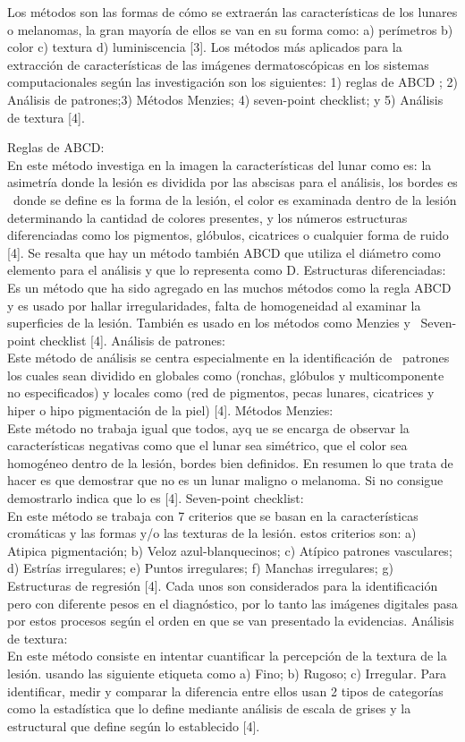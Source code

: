 \documentclass[a4paper]{article}
\begin{document}
Los métodos son las formas de cómo se extraerán las características de los lunares o melanomas, la gran mayoría de ellos se van en su forma como: a) perímetros b) color c) textura d) luminiscencia [3].
Los métodos más aplicados para la extracción de características de las imágenes dermatoscópicas en los sistemas computacionales según las investigación son los siguientes: 1) reglas de ABCD ; 2) Análisis de patrones;3) Métodos Menzies; 4) seven-point checklist; y 5) Análisis de textura [4].

Reglas de ABCD:\\ 
En este método investiga en la imagen la características del lunar como es: la asimetría donde la lesión es dividida por las abscisas para el análisis, los bordes es  donde se define es la forma de la lesión, el color es examinada dentro de la lesión determinando la cantidad de colores presentes, y los números estructuras diferenciadas como los pigmentos, glóbulos, cicatrices o cualquier forma de ruido [4].
Se resalta que hay un método también ABCD que utiliza el diámetro como elemento para el análisis y que lo representa como D. 
Estructuras diferenciadas:\\
Es un método que ha sido agregado en las muchos métodos como la regla ABCD y es usado por hallar irregularidades, falta de homogeneidad al examinar la superficies de la lesión. También es usado en los métodos como Menzies y  Seven-point checklist [4].
Análisis de patrones:\\
Este método de análisis se centra especialmente en la identificación de  patrones los cuales sean dividido en globales como (ronchas, glóbulos y multicomponente no especificados) y locales como (red de pigmentos, pecas lunares, cicatrices y hiper o hipo pigmentación de la piel) [4].
Métodos Menzies:\\
Este método no trabaja igual que todos, ayq ue se encarga de observar la características negativas como que el lunar sea simétrico, que el color sea homogéneo dentro de la lesión, bordes bien definidos. En resumen lo que trata de hacer es que demostrar que no es un lunar maligno o melanoma. Si no consigue demostrarlo indica que lo es [4].
Seven-point checklist:\\
En este método se trabaja con 7 criterios que se basan en la características cromáticas y las formas y/o las texturas de la lesión. estos criterios son: a) Atipica pigmentación; b) Veloz azul-blanquecinos; c) Atípico patrones vasculares; d) Estrías irregulares; e) Puntos irregulares; f) Manchas irregulares; g) Estructuras de regresión [4].
Cada unos son considerados para la identificación pero con diferente pesos en el diagnóstico, por lo tanto las imágenes digitales pasa por estos procesos según el orden en que se van presentado la evidencias. 
Análisis de textura:\\
En este método consiste en intentar cuantificar la percepción de la textura de la lesión. usando las siguiente etiqueta como a) Fino; b) Rugoso; c) Irregular. Para identificar, medir y comparar la diferencia entre ellos usan 2 tipos de categorías como la estadística que lo define mediante análisis de escala de grises y la estructural que define según lo establecido [4].
\end{document}
